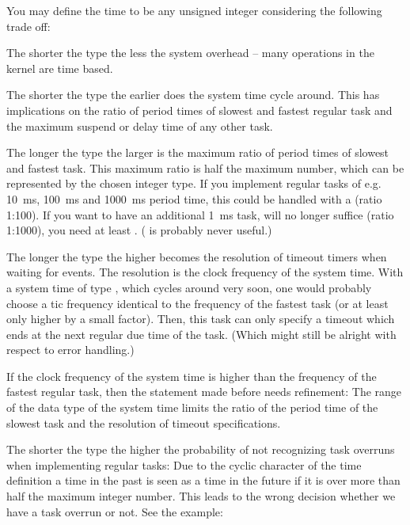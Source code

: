 You may define the time to be any unsigned integer considering the
following trade off:

The shorter the type the less the system overhead -- many operations in
the kernel are time based.

The shorter the type the earlier does the system time cycle around. This
has implications on the ratio of period times of slowest and fastest
regular task and the maximum suspend or delay time of any other task.

The longer the type the larger is the maximum ratio of period times of
slowest and fastest task. This maximum ratio is half the maximum number,
which can be represented by the chosen integer type. If you implement
regular tasks of e.g. 10~ms, 100~ms and 1000~ms period time, this could be
handled with a  (ratio 1:100). If you want to have an
additional 1~ms task,  will no longer suffice (ratio
1:1000), you need at least . ( is
probably never useful.)

The longer the type the higher becomes the resolution of timeout timers
when waiting for events. The resolution is the clock frequency of the
system time. With a system time of type , which cycles
around very soon, one would probably choose a tic frequency identical to
the frequency of the fastest task (or at least only higher by a small
factor). Then, this task can only specify a timeout which ends at the next
regular due time of the task. (Which might still be alright with respect
to error handling.)

If the clock frequency of the system time is higher than the frequency of
the fastest regular task, then the statement made before needs refinement:
The range of the data type of the system time limits the ratio of the period
time of the slowest task and the resolution of timeout specifications.

The shorter the type the higher the probability of not recognizing task
overruns when implementing regular tasks: Due to the cyclic character of
the time definition a time in the past is seen as a time in the future if
it is over more than half the maximum integer number. This leads to the
wrong decision whether we have a task overrun or not. See the example:


